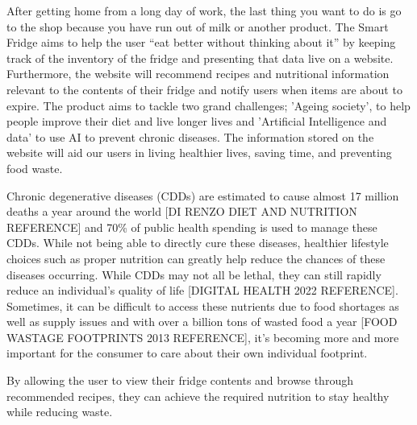 




After getting home from a long day of work, the last thing you want to do is go to the shop because you have run out of milk or another product.
The Smart Fridge aims to help the user “eat better without thinking about it” by keeping track of the inventory of the fridge and presenting that data live on a website.
Furthermore, the website will recommend recipes and nutritional information relevant to the contents of their fridge and notify users when items are about to expire.
The product aims to tackle two grand challenges; 'Ageing society', to help people improve their diet and live longer lives and 'Artificial Intelligence and data' to use AI to prevent chronic diseases.
The information stored on the website will aid our users in living healthier lives, saving time, and preventing food waste.  

Chronic degenerative diseases (CDDs) are estimated to cause almost 17 million deaths a year around the world [DI RENZO DIET AND NUTRITION REFERENCE] and 70\% of public health spending is used to manage these CDDs.
While not being able to directly cure these diseases, healthier lifestyle choices such as proper nutrition can greatly help reduce the chances of these diseases occurring.
While CDDs may not all be lethal, they can still rapidly reduce an individual's quality of life [DIGITAL HEALTH 2022 REFERENCE].
Sometimes, it can be difficult to access these nutrients due to food shortages as well as supply issues and with over a billion tons of wasted food a year [FOOD WASTAGE FOOTPRINTS 2013 REFERENCE], it's becoming more and more important for the consumer to care about their own individual footprint.  

By allowing the user to view their fridge contents and browse through recommended recipes, they can achieve the required nutrition to stay healthy while reducing waste.